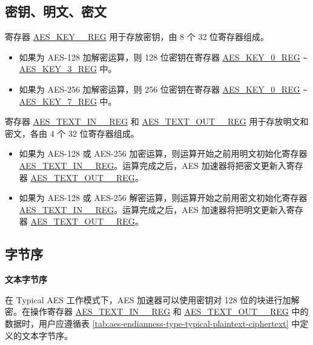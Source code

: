 \documentclass[main\_\_CN.tex]{subfiles}
\begin{document}
\subsection{密钥、明文、密文}

寄存器 \hyperref[regdesc:AESKEYnREG]{AES\_KEY\_\_REG} 用于存放密钥，由 8 个 32 位寄存器组成。

\begin{itemize}
    \item 如果为 AES-128 加解密运算，则 128 位密钥在寄存器 \hyperref[regdesc:AESKEYnREG]{AES\_KEY\_0\_REG} \verb+~+ \hyperref[regdesc:AESKEYnREG]{AES\_KEY\_3\_REG} 中。
    \item 如果为 AES-256 加解密运算，则 256 位密钥在寄存器 \hyperref[regdesc:AESKEYnREG]{AES\_KEY\_0\_REG} \verb+~+ \hyperref[regdesc:AESKEYnREG]{AES\_KEY\_7\_REG} 中。
\end{itemize}

寄存器 \hyperref[regdesc:AESTEXTINnREG]{AES\_TEXT\_IN\_\_REG} 和 \hyperref[regdesc:AESTEXTOUTnREG]{AES\_TEXT\_OUT\_\_REG} 用于存放明文和密文，各由 4 个 32 位寄存器组成。

\begin{itemize}
    \item 如果为 AES-128 或 AES-256 加密运算，则运算开始之前用明文初始化寄存器 \hyperref[regdesc:AESTEXTINnREG]{AES\_TEXT\_IN\_\_REG}。运算完成之后，AES 加速器将把密文更新入寄存器 \hyperref[regdesc:AESTEXTOUTnREG]{AES\_TEXT\_OUT\_\_REG}。
    \item 如果为 AES-128 或 AES-256 解密运算，则运算开始之前用密文初始化寄存器 \hyperref[regdesc:AESTEXTINnREG]{AES\_TEXT\_IN\_\_REG}。运算完成之后，AES 加速器将把明文更新入寄存器 \hyperref[regdesc:AESTEXTOUTnREG]{AES\_TEXT\_OUT\_\_REG}。
\end{itemize}

\subsection{字节序}

\textbf{文本字节序}

在 Typical AES 工作模式下，AES 加速器可以使用密钥对 128 位的块进行加解密。在操作寄存器 \hyperref[regdesc:AESTEXTINnREG]{AES\_TEXT\_IN\_\_REG} 和 \hyperref[regdesc:AESTEXTINnREG]{AES\_TEXT\_OUT\_\_REG} 中的数据时，用户应遵循表 \ref{tab:aes-endianness-type-typical-plaintext-ciphertext} 中定义的文本字节序。

\end{document}
